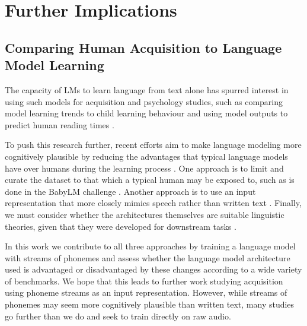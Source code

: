 

\section{Further Implications}
\label{sec:14-further}

\subsection{Comparing Human Acquisition to Language Model Learning}
\label{sec:14-acquisition}


The capacity of LMs to learn language from text alone has spurred interest in using such models for acquisition and psychology studies, such as comparing model learning trends to child learning behaviour \citep{evanson-etal-2023-language} and using model outputs to predict human reading times \citep{hollenstein-etal-2021-multilingual}.

To push this research further, recent efforts aim to make language modeling more cognitively plausible \citep{beinborn2024cognitive} by reducing the advantages that typical language models have over humans during the learning process \citep{warstadt-2022-artificial}. One approach is to limit and curate the dataset to that which a typical human may be exposed to, such as is done in the BabyLM challenge \citep{warstadt-2023-babylm-findings}. Another approach is to use an input representation that more closely mimics speech rather than written text \citep{dupoux-2018-cognitive}. Finally, we must consider whether the architectures themselves are suitable linguistic theories, given that they were developed for downstream tasks \citep{baroni-2022-proper}.

In this work we contribute to all three approaches by training a language model with streams of phonemes and assess whether the language model architecture used is advantaged or disadvantaged by these changes according to a wide variety of benchmarks. We hope that this leads to further work studying acquisition using phoneme streams as an input representation. However, while streams of phonemes may seem more cognitively plausible than written text, many studies go further than we do and seek to train directly on raw audio.

